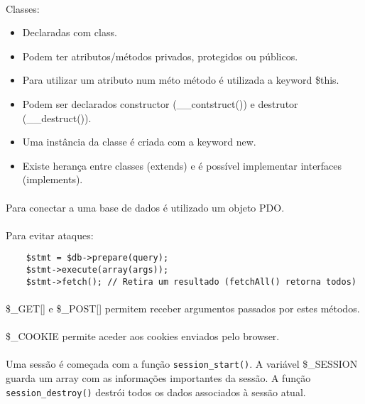\documentclass[../resumosLTW.tex]{subfiles}
\begin{document}
\paragraph{}

Classes:
\begin{itemize}
    \item Declaradas com class.
    \item Podem ter atributos/métodos privados, protegidos ou públicos.
    \item Para utilizar um atributo num méto método é utilizada a keyword \$this.
    \item Podem ser declarados constructor (\_\_contstruct()) e destrutor (\_\_destruct()).
    \item Uma instância da classe é criada com a keyword new.
    \item Existe herança entre classes (extends) e é possível implementar interfaces (implements).
\end{itemize}

\paragraph{}

Para conectar a uma base de dados é utilizado um objeto PDO.

\paragraph{}

Para evitar ataques:
\begin{lstlisting}
    $stmt = $db->prepare(query);
    $stmt->execute(array(args));
    $stmt->fetch(); // Retira um resultado (fetchAll() retorna todos)
\end{lstlisting}

\paragraph{}

\$\_GET[] e \$\_POST[] permitem receber argumentos passados por estes métodos.

\paragraph{}

\$\_COOKIE permite aceder aos cookies enviados pelo browser.

\paragraph{}

Uma sessão é começada com a função \lstinline{session_start()}. A variável \$\_SESSION guarda um array com as informações importantes da sessão. A função \lstinline{session_destroy()} destrói todos os dados associados à sessão atual.
\end{document}
